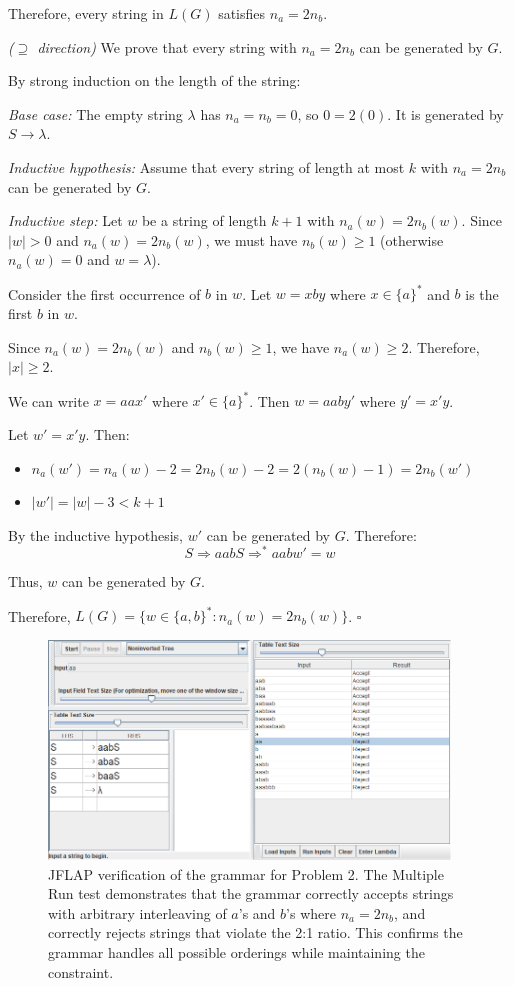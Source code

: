 \documentclass[12pt]{article}
\begin{document}
Therefore, every string in $L(G)$ satisfies $n_a = 2n_b$.

\textit{($\supseteq$ direction)} We prove that every string with $n_a = 2n_b$ can be generated by $G$.

By strong induction on the length of the string:

\textit{Base case:} The empty string $\lambda$ has $n_a = n_b = 0$, so $0 = 2(0)$. It is generated by $S \rightarrow \lambda$.

\textit{Inductive hypothesis:} Assume that every string of length at most $k$ with $n_a = 2n_b$ can be generated by $G$.

\textit{Inductive step:} Let $w$ be a string of length $k+1$ with $n_a(w) = 2n_b(w)$. Since $|w| > 0$ and $n_a(w) = 2n_b(w)$, we must have $n_b(w) \ge 1$ (otherwise $n_a(w) = 0$ and $w = \lambda$).

Consider the first occurrence of $b$ in $w$. Let $w = x b y$ where $x \in \{a\}^*$ and $b$ is the first $b$ in $w$.

Since $n_a(w) = 2n_b(w)$ and $n_b(w) \ge 1$, we have $n_a(w) \ge 2$. Therefore, $|x| \ge 2$.

We can write $x = aa x'$ where $x' \in \{a\}^*$. Then $w = aa b y'$ where $y' = x' y$.

Let $w' = x' y$. Then:
\begin{itemize}
\item $n_a(w') = n_a(w) - 2 = 2n_b(w) - 2 = 2(n_b(w) - 1) = 2n_b(w')$
\item $|w'| = |w| - 3 < k+1$
\end{itemize}

By the inductive hypothesis, $w'$ can be generated by $G$. Therefore:
$$S \Rightarrow aabS \Rightarrow^* aabw' = w$$

Thus, $w$ can be generated by $G$.

Therefore, $L(G) = \{w \in \{a,b\}^* : n_a(w) = 2n_b(w)\}$. $\square$

\begin{figure}[H]
\centering
\includegraphics[width=0.95\textwidth]{Problem 2/Problem 2.png}
\caption{JFLAP verification of the grammar for Problem 2. The Multiple Run test demonstrates that the grammar correctly accepts strings with arbitrary interleaving of $a$'s and $b$'s where $n_a = 2n_b$, and correctly rejects strings that violate the 2:1 ratio. This confirms the grammar handles all possible orderings while maintaining the constraint.}
\label{fig:problem2}
\end{figure}
\end{document}
